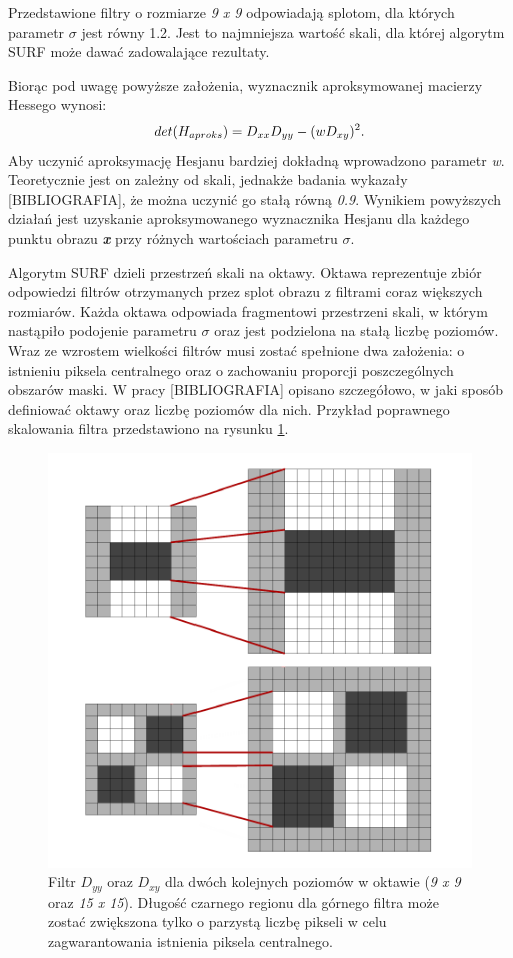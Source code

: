 Przedstawione filtry o rozmiarze \textit{9 x 9} odpowiadają splotom, dla których parametr $\sigma$ jest równy 1.2. Jest to najmniejsza wartość skali, dla której algorytm SURF może dawać zadowalające rezultaty.

Biorąc pod uwagę powyższe założenia, wyznacznik aproksymowanej macierzy Hessego wynosi:
\begin{equation}\textsl{}
det(H_{aproks}) = D_{xx}D_{yy} - (wD_{xy})^2.
\end{equation}
Aby uczynić aproksymację Hesjanu bardziej dokładną wprowadzono parametr \textit{w}. Teoretycznie jest on zależny od skali, jednakże badania wykazały [BIBLIOGRAFIA], że można uczynić go stałą równą \textit{0.9}.  
Wynikiem powyższych działań jest uzyskanie aproksymowanego wyznacznika Hesjanu dla każdego punktu obrazu \textit{\textbf{x}} przy różnych wartościach parametru $\sigma$.

 Algorytm SURF dzieli przestrzeń skali na oktawy. Oktawa reprezentuje zbiór odpowiedzi filtrów otrzymanych przez splot obrazu z filtrami coraz większych rozmiarów. Każda oktawa odpowiada fragmentowi przestrzeni skali, w którym nastąpiło podojenie parametru $\sigma$ oraz jest podzielona na stałą liczbę poziomów. Wraz ze wzrostem wielkości filtrów musi zostać spełnione dwa założenia: o istnieniu piksela centralnego oraz o zachowaniu proporcji poszczególnych obszarów maski. W pracy [BIBLIOGRAFIA] opisano szczegółowo, w jaki sposób definiować oktawy oraz liczbę poziomów dla nich. Przykład poprawnego skalowania filtra przedstawiono na rysunku \ref{im: FiltersScale}. 
 
 \begin{figure}[h]
 	\includegraphics[width=12cm]{FiltersScale}
 	\centering
 	\caption{Filtr $D_{yy}$ oraz $D_{xy}$ dla dwóch kolejnych poziomów w oktawie (\textit{9 x 9} oraz \textit{15 x 15}). Długość czarnego regionu dla górnego filtra może zostać zwiększona tylko o parzystą liczbę pikseli w celu zagwarantowania istnienia piksela centralnego.}
 	\label{im: FiltersScale}
 \end{figure}
 
